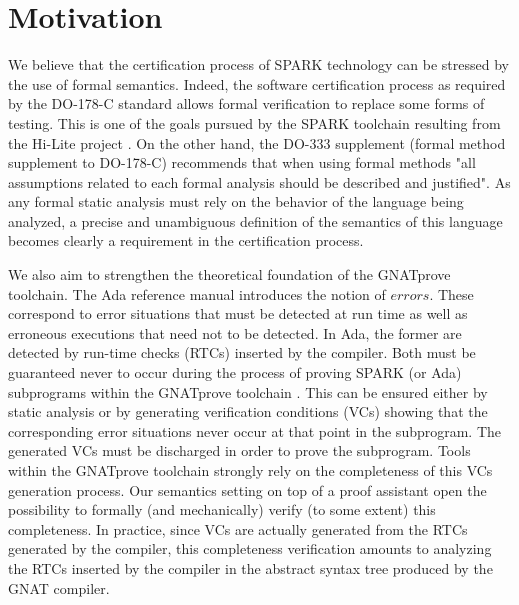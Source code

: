\section{Motivation}
We believe that the certification process of SPARK technology can be
stressed by the use of formal semantics.
Indeed, the software certification process as required by the DO-178-C \cite{RTCA:DO-178} 
standard allows formal verification to replace some forms of testing. 
This is one of the goals pursued by the SPARK toolchain resulting from 
the Hi-Lite project \cite{Hi-Lite:URL}. On the other hand, the DO-333 
supplement \cite{RTCA:DO-333} (formal method supplement to DO-178-C) recommends that 
when using formal methods "all assumptions related to each formal 
analysis should be described and justified". As any formal static 
analysis must rely on the behavior of the language being analyzed, a 
precise and unambiguous definition of the semantics of this language 
becomes clearly a requirement in the certification process.

We also aim to strengthen the theoretical foundation of the GNATprove
toolchain.
The Ada reference manual \cite{Ada:URL} introduces the notion of $\mathit{errors}$.
These correspond to error situations that must be detected 
at run time as well as erroneous executions that need not to be 
detected. In Ada, the former are detected by run-time checks 
(RTCs) inserted by the compiler. Both must be guaranteed never to
occur during the process of proving SPARK (or Ada) subprograms within
the GNATprove toolchain \cite{Gnatprove:URL}. This can be ensured either by static
analysis or by generating verification conditions (VCs) showing that 
the corresponding error situations never occur at that point in the 
subprogram. The generated VCs must be discharged in order to prove the 
subprogram.  Tools within the GNATprove toolchain strongly rely on the 
completeness of this VCs generation process. Our semantics setting on 
top of a proof assistant open the possibility to formally (and 
mechanically) verify (to some extent) this completeness. In practice, 
since VCs are actually generated from the RTCs generated by the 
compiler, this completeness verification amounts to analyzing the RTCs 
inserted by the compiler in the abstract syntax tree produced by the 
GNAT compiler.

